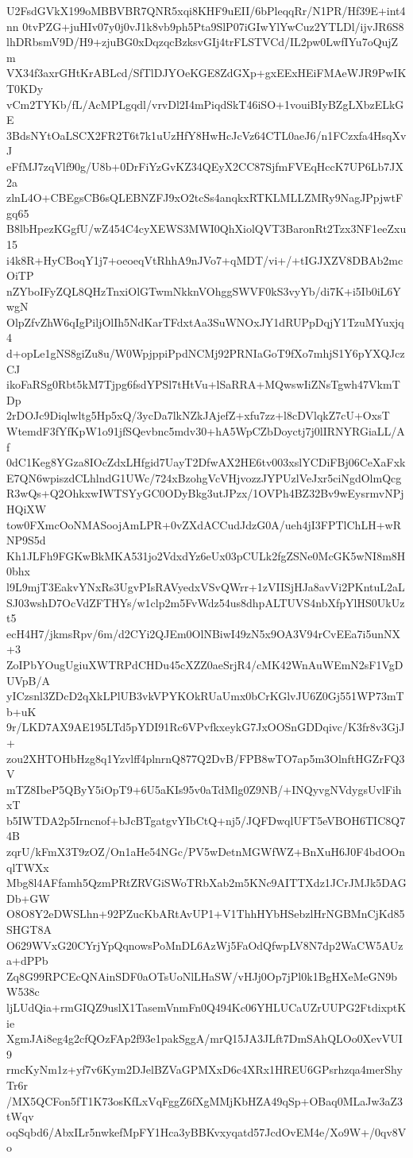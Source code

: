 U2FsdGVkX199oMBBVBR7QNR5xqi8KHF9uEII/6bPleqqRr/N1PR/Hf39E+int4nn
0tvPZG+juHIv07y0j0vJ1k8vb9ph5Pta9SlP07iGIwYlYwCuz2YTLDl/ijvJR6S8
lhDRbsmV9D/H9+zjuBG0xDqzqcBzksvGIj4trFLSTVCd/IL2pw0LwfIYu7oQujZm
VX34f3axrGHtKrABLcd/SfTlDJYOeKGE8ZdGXp+gxEExHEiFMAeWJR9PwIKT0KDy
vCm2TYKb/fL/AcMPLgqdl/vrvDl2I4mPiqdSkT46iSO+1vouiBIyBZgLXbzELkGE
3BdsNYtOaLSCX2FR2T6t7k1uUzHfY8HwHcJcVz64CTL0aeJ6/n1FCzxfa4HsqXvJ
eFfMJ7zqVlf90g/U8b+0DrFiYzGvKZ34QEyX2CC87SjfmFVEqHccK7UP6Lb7JX2a
zlnL4O+CBEgsCB6sQLEBNZFJ9xO2tcSs4anqkxRTKLMLLZMRy9NagJPpjwtFgq65
B8lbHpezKGgfU/wZ454C4cyXEWS3MWI0QhXiolQVT3BaronRt2Tzx3NF1eeZxu15
i4k8R+HyCBoqY1j7+oeoeqVtRhhA9nJVo7+qMDT/vi+/+tIGJXZV8DBAb2mcOiTP
nZYboIFyZQL8QHzTnxiOlGTwmNkknVOhggSWVF0kS3vyYb/di7K+i5Ib0iL6YwgN
OlpZfvZhW6qIgPiljOlIh5NdKarTFdxtAa3SuWNOxJY1dRUPpDqjY1TzuMYuxjq4
d+opLe1gNS8giZu8u/W0WpjppiPpdNCMj92PRNIaGoT9fXo7mhjS1Y6pYXQJczCJ
ikoFaRSg0Rbt5kM7Tjpg6fsdYPSl7tHtVu+lSaRRA+MQwswIiZNsTgwh47VkmTDp
2rDOJc9Diqlwltg5Hp5xQ/3ycDa7lkNZkJAjefZ+xfu7zz+l8cDVlqkZ7cU+OxsT
WtemdF3fYfKpW1o91jfSQevbnc5mdv30+hA5WpCZbDoyctj7j0lIRNYRGiaLL/Af
0dC1Keg8YGza8IOcZdxLHfgid7UayT2DfwAX2HE6tv003xslYCDiFBj06CeXaFxk
E7QN6wpiszdCLhlndG1UWc/724xBzohgVcVHjvozzJYPUzlVeJxr5ciNgdOlmQcg
R3wQs+Q2OhkxwIWTSYyGC0ODyBkg3utJPzx/1OVPh4BZ32Bv9wEysrmvNPjHQiXW
tow0FXmcOoNMASoojAmLPR+0vZXdACCudJdzG0A/ueh4jI3FPTlChLH+wRNP9S5d
Kh1JLFh9FGKwBkMKA531jo2VdxdYz6eUx03pCULk2fgZSNe0McGK5wNI8m8H0bhx
l9L9mjT3EakvYNxRs3UgvPIsRAVyedxVSvQWrr+1zVIISjHJa8avVi2PKntuL2aL
SJ03wshD7OcVdZFTHYs/w1clp2m5FvWdz54us8dhpALTUVS4nbXfpYlHS0UkUzt5
ecH4H7/jkmsRpv/6m/d2CYi2QJEm0OlNBiwI49zN5x9OA3V94rCvEEa7i5unNX+3
ZoIPbYOugUgiuXWTRPdCHDu45cXZZ0aeSrjR4/cMK42WnAuWEmN2sF1VgDUVpB/A
yICzsnl3ZDcD2qXkLPlUB3vkVPYKOkRUaUmx0bCrKGlvJU6Z0Gj551WP73mTb+uK
9r/LKD7AX9AE195LTd5pYDI91Rc6VPvfkxeykG7JxOOSnGDDqivc/K3fr8v3GjJ+
zou2XHTOHbHzg8q1Yzvlff4plnrnQ877Q2DvB/FPB8wTO7ap5m3OlnftHGZrFQ3V
mTZ8IbeP5QByY5iOpT9+6U5aKIs95v0aTdMlg0Z9NB/+INQyvgNVdygsUvlFihxT
b5IWTDA2p5Irncnof+bJcBTgatgvYIbCtQ+nj5/JQFDwqlUFT5eVBOH6TIC8Q74B
zqrU/kFmX3T9zOZ/On1aHe54NGc/PV5wDetnMGWfWZ+BnXuH6J0F4bdOOnqlTWXx
Mbg8l4AFfamh5QzmPRtZRVGiSWoTRbXab2m5KNc9AITTXdz1JCrJMJk5DAGDb+GW
O8O8Y2eDWSLhn+92PZucKbARtAvUP1+V1ThhHYbHSebzlHrNGBMnCjKd85SHGT8A
O629WVxG20CYrjYpQqnowsPoMnDL6AzWj5FaOdQfwpLV8N7dp2WaCW5AUza+dPPb
Zq8G99RPCEcQNAinSDF0aOTsUoNlLHaSW/vHJj0Op7jPl0k1BgHXeMeGN9bW538c
ljLUdQia+rmGIQZ9uslX1TasemVnmFn0Q494Kc06YHLUCaUZrUUPG2FtdixptKie
XgmJAi8eg4g2cfQOzFAp2f93e1pakSggA/mrQ15JA3JLft7DmSAhQLOo0XevVUI9
rmcKyNm1z+yf7v6Kym2DJelBZVaGPMXxD6c4XRx1HREU6GPsrhzqa4merShyTr6r
/MX5QCFon5fT1K73osKfLxVqFggZ6fXgMMjKbHZA49qSp+OBaq0MLaJw3aZ3tWqv
oqSqbd6/AbxILr5nwkefMpFY1Hca3yBBKvxyqatd57JcdOvEM4e/Xo9W+/0qv8Vo
